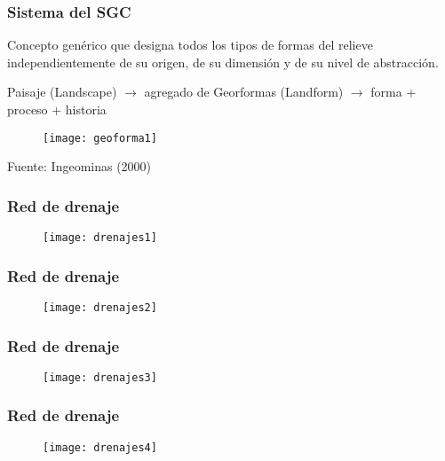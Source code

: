 \documentclass[14pt]{beamer}
\begin{document}
  \begin{frame}
\frametitle{Sistema del SGC}
\scriptsize{Concepto genérico que designa todos los tipos de formas del relieve independientemente de su origen, de su dimensión y de su nivel de abstracción.}\\
\begin{center}
Paisaje (Landscape) $\rightarrow$ agregado de Georformas (Landform) $\rightarrow$ forma + proceso + historia
\\
\end{center}
 \begin{figure}
    \centering
    \texttt{[image: geoforma1]}
  \end{figure}
  \tiny{Fuente: Ingeominas (2000)}
\end{frame}
  \begin{frame}
\frametitle{Red de drenaje}
 \begin{figure}
    \centering
    \texttt{[image: drenajes1]}
  \end{figure}
\end{frame}
  \begin{frame}
\frametitle{Red de drenaje}
 \begin{figure}
    \centering
    \texttt{[image: drenajes2]}
  \end{figure}
\end{frame}
  \begin{frame}
\frametitle{Red de drenaje}
 \begin{figure}
    \centering
    \texttt{[image: drenajes3]}
  \end{figure}
\end{frame}
  \begin{frame}
\frametitle{Red de drenaje}
 \begin{figure}
    \centering
    \texttt{[image: drenajes4]}
  \end{figure}
\end{frame}
\end{document}
